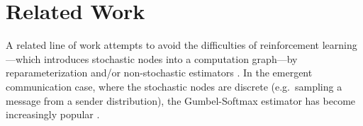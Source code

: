 \documentclass[11pt,a4paper]{article}
\newcommand{\nbSST}[1]{{\leavevmode\color{violet}{\scriptsize#1}}}
\begin{document}
%
%
%

\section{Related Work}


A related line of work attempts to avoid the difficulties of reinforcement learning---which introduces stochastic nodes into a computation graph---by reparameterization and/or non-stochastic estimators \citep{Bengio2013, Schulman2015}.  In the emergent communication case, where the stochastic nodes are discrete (e.g.\ sampling a message from a sender distribution), the Gumbel-Softmax estimator has become increasingly popular \citep{Jang2017, Maddison2017}.  
\end{document}
